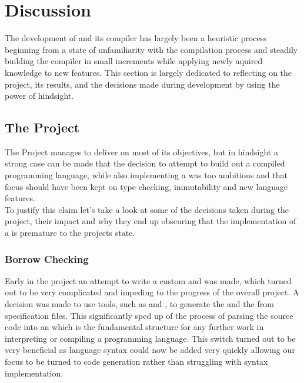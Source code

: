 \section{Discussion}
\label{sec:Discussion}

The development of \lang{} and its compiler has largely been a heuristic process
beginning from a state of unfamiliarity with the compilation process and steadily
building the compiler in small increments while applying newly aquired knowledge to
new features. This section is largely dedicated to reflecting on the project, its
results, and the decisions made during development by using the power of hindsight. 

\subsection{The Project}

The Project manages to deliver on most of its objectives, but in hindsight a strong
case can be made that the decision to attempt to build out a compiled programming
language, while also implementing a \borrowChecker{} was too ambitious and that focus
should have been kept on type checking, immutability and new language features. \\

To justify this claim let's take a look at some of the decisions taken during the
project, their impact and why they end up obscuring that the implementation of a
\borrowChecker{} is premature to the projects state.

\subsubsection{Borrow Checking}

Early in the project an attempt to write a custom \lexer{} and \parser{} was
made, which turned out to be very complicated and impeding to the progress of the
overall project. A decision was made to use tools, such as \lexerGen{} and
\parserGen{}, to generate the \lexer{} and the \parser{} from specification files.
This significantly sped up of the process of parsing the source code into an \ast{}
which is the fundamental structure for any further work in interpreting or compiling
a programming language. This switch turned out to be very beneficial as language
syntax could now be added very quickly allowing our focus to be turned to code
generation rather than struggling with syntax implementation. \\ 

